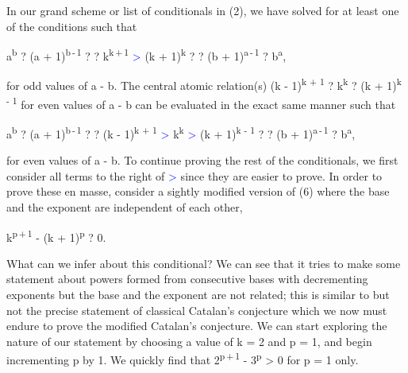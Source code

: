 \documentclass[a4paper,10pt]{article}
\begin{document}
\begin{flushleft}
{{	\linebreak\linebreak
	In our grand scheme or list of conditionals in (2), we have solved for at least one of the conditions such that
	\vspace{2mm}
	\begin{center}
	a\textsuperscript{b} ? (a + 1)\textsuperscript{b\,-\,1} ? {\cdot\cdot\cdot} ? k\textsuperscript{k\,+\,1} \textcolor{blue}{>} (k + 1)\textsuperscript{k} ? {\cdot\cdot\cdot} ? (b + 1)\textsuperscript{a\,-\,1} ? b\textsuperscript{a},
	\end{center}
	\begin{flushright}
		{\vspace{-7.5mm}}
	\end{flushright}
	\vspace{2mm}
	for odd values of a - b. The central atomic relation(s) (k - 1)\textsuperscript{k + 1} ? k\textsuperscript{k} ? (k + 1)\textsuperscript{k - 1} for even values of a - b can be evaluated in the exact same manner such that
	\vspace{2mm}
	\begin{center}
	a\textsuperscript{b} ? (a + 1)\textsuperscript{b\,-\,1} ? {\cdot\cdot\cdot} ? (k - 1)\textsuperscript{k + 1} \textcolor{blue}{>} k\textsuperscript{k} \textcolor{blue}{>} (k + 1)\textsuperscript{k - 1} ? {\cdot\cdot\cdot} ? (b + 1)\textsuperscript{a\,-\,1} ? b\textsuperscript{a},
	\end{center}
	\begin{flushright}
		{\vspace{-3.0mm}\mono{(8)}}
	\end{flushright}
	\vspace{-2mm}
	for even values of a - b. To continue proving the rest of the conditionals, we first consider all terms to the right of \textcolor{blue}{>} since they are easier to prove. In order to prove these en masse, consider a sightly modified version of (6) where the base and the exponent are independent of each other,
	\vspace{2mm}
	\begin{center}
	k\textsuperscript{p\,+\,1} - (k + 1)\textsuperscript{p} ? 0.
	\end{center}
	\begin{flushright}
		{\vspace{-7.5mm}\mono{(9)}}
	\end{flushright}
	\vspace{2mm}
	What can we infer about this conditional? We can see that it tries to make some statement about powers formed from consecutive bases with decrementing exponents but the base and the exponent are not related; this is similar to but not the precise statement of classical Catalan's conjecture which we now must endure to prove the modified Catalan's conjecture. We can start exploring the nature of our statement by choosing a value of k = 2 and p = 1, and begin incrementing p by 1. We quickly find that 2\textsuperscript{p\,+\,1} - 3\textsuperscript{p} > 0 for p = 1 only.\linebreak
	
}}
\end{flushleft}
\end{document}
